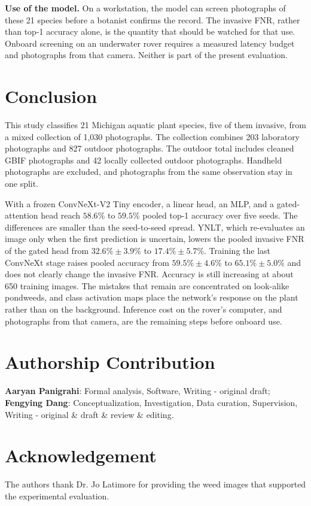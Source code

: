 \documentclass[final,3p,times,twocolumn]{elsarticle}
\begin{document}
\textbf{Use of the model.}
On a workstation, the model can screen photographs of these 21 species before a botanist confirms the record. The invasive FNR, rather than top-1 accuracy alone, is the quantity that should be watched for that use. Onboard screening on an underwater rover requires a measured latency budget and photographs from that camera. Neither is part of the present evaluation.

\section{Conclusion}
\label{sec:conclu}

This study classifies 21 Michigan aquatic plant species, five of them invasive, from a mixed collection of 1{,}030 photographs. The collection combines 203 laboratory photographs and 827 outdoor photographs. The outdoor total includes cleaned GBIF photographs and 42 locally collected outdoor photographs. Handheld photographs are excluded, and photographs from the same observation stay in one split.

With a frozen ConvNeXt-V2 Tiny encoder, a linear head, an MLP, and a gated-attention head reach \(58.6\%\) to \(59.5\%\) pooled top-1 accuracy over five seeds. The differences are smaller than the seed-to-seed spread. YNLT, which re-evaluates an image only when the first prediction is uncertain, lowers the pooled invasive FNR of the gated head from \(32.6\% \pm 3.9\%\) to \(17.4\% \pm 5.7\%\). Training the last ConvNeXt stage raises pooled accuracy from \(59.5\% \pm 4.6\%\) to \(65.1\% \pm 5.0\%\) and does not clearly change the invasive FNR. Accuracy is still increasing at about 650 training images. The mistakes that remain are concentrated on look-alike pondweeds, and class activation maps place the network's response on the plant rather than on the background. Inference cost on the rover's computer, and photographs from that camera, are the remaining steps before onboard use.


\section*{Authorship Contribution}

\textbf{Aaryan Panigrahi}: Formal analysis, Software, Writing - original draft; \\
\textbf{Fengying Dang}: Conceptualization, Investigation, Data curation, Supervision, Writing - original \& draft \& review \& editing.  

\section*{Acknowledgement}
The authors thank Dr. Jo Latimore for providing the weed images that supported the experimental evaluation.


\typeout{}
% 

\end{document}
